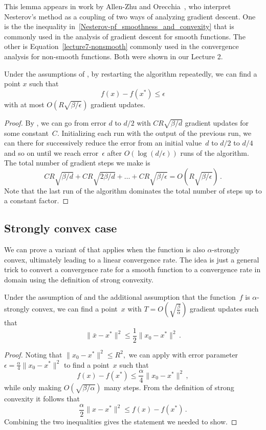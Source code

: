 This lemma appears in work by Allen-Zhu and Orecchia~\cite{allen2014linear}, who
interpret Nesterov's method as a coupling of two ways of analyzing gradient
descent. One is the the inequality
in~\eqref{Nesterov-pf_smoothness_and_convexity} that is commonly used in the
analysis of gradient descent for smooth functions. The other is
Equation~\ref{lecture7-nonsmooth} commonly used in the convergence analysis for
non-smooth functions. Both were shown in our Lecture 2.

\begin{theorem}
Under the assumptions of , by restarting the algorithm
repeatedly, we can find a point $x$ such that
\[
f(x)-f(x^*)\le\epsilon
\]
with at most $O(R\sqrt{\beta/\epsilon})$ gradient updates.
\end{theorem}
\begin{proof}
By , we can go from error $d$ to $d/2$ with
$CR\sqrt{\beta/d}$ gradient updates for some constant~$C$. 
Initializing each run with the output of
the previous run, we can there for successively reduce the error from an initial
value~$d$ to $d/2$ to $d/4$ and so on until we reach error~$\epsilon$ after
$O(\log(d/\epsilon))$ runs of the algorithm. The total number of gradient steps
we make is
\[
CR\sqrt{\beta/d} 
+CR\sqrt{2\beta/d}
+\dots+CR\sqrt{\beta/\epsilon}
= O\left(R\sqrt{\beta/\epsilon}\right)\,.
\]
Note that the last run of the algorithm dominates the total number of steps up to a
constant factor.
\end{proof}

\subsection{Strongly convex case}

We can prove a variant of  that applies when the
function is also $\alpha$-strongly convex, ultimately leading to a linear
convergence rate. The idea is just a general trick to convert a convergence rate
for a smooth function to a convergence rate in domain using the definition of
strong convexity.

\begin{lemma}
Under the assumption of  and the additional assumption
that the function~$f$ is $\alpha$-strongly convex, we 
can find a point~$x$ with $T = O\left(\sqrt{\frac{\beta}{\alpha}}\right)$
gradient updates such that
\[
\|\bar x - x^*\|^2 \leq \frac12\|x_0-x^*\|^2\,.
\]
\end{lemma}
\begin{proof}
Noting that $\|x_0-x^*\|^2\le R^2,$ we can apply  with
error parameter $\epsilon = \frac{\alpha}4 \|x_0-x^*\|^2$ to find a point~$x$ such that
\[
f(x)-f(x^*)\le \frac\alpha4\|x_0-x^*\|^2\,,
\]
while only making $O\left(\sqrt{\beta/\alpha}\right)$ many steps.
From the definition of strong convexity it follows that
\[
\frac\alpha2 \|x-x^*\|^2 \le f(x)-f(x^*)\,.
\]
Combining the two inequalities gives the statement we needed to show.
\end{proof}

